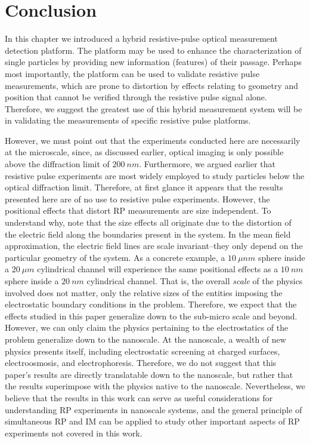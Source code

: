 			
		
	\section{Conclusion}
		In this chapter we introduced a hybrid resistive-pulse optical measurement detection platform. The platform may be used to enhance the characterization of single particles by providing new information (features) of their passage. Perhaps most importantly, the platform can be used to validate resistive pulse measurements, which are prone to distortion by effects relating to geometry and position that cannot be verified through the resistive pulse signal alone. Therefore, we suggest the greatest use of this hybrid measurement system will be in validating the measurements of specific resistive pulse platforms.
		
		However, we must point out that the experiments conducted here are necessarily at the microscale, since, as discussed earlier, optical imaging is only possible above the diffraction limit of $\SI{200}{nm}$. Furthermore, we argued earlier that resistive pulse experiments are most widely employed to study particles below the optical diffraction limit. Therefore, at first glance it appears that the results presented here are of no use to resistive pulse experiments. However, the positional effects that distort RP measurements are size independent. To understand why, note that the size effects all originate due to the distortion of the electric field along the boundaries present in the system. In the mean field approximation, the electric field lines are scale invariant--they only depend on the particular geometry of the system. As a concrete example, a $\SI{10}{\mu nm}$ sphere inside a $\SI{20}{\mu m}$ cylindrical channel will experience the same positional effects as a $\SI{10}{nm}$ sphere inside a $\SI{20}{nm}$ cylindrical channel. That is, the overall \textit{scale} of the physics involved does not matter, only the relative sizes of the entities imposing the electrostatic boundary conditions in the problem. Therefore, we expect that the effects studied in this paper generalize down to the sub-micro scale and beyond. However, we can only claim the physics pertaining to the electrostatics of the problem generalize down to the nanoscale. At the nanoscale, a wealth of new physics presents itself, including electrostatic screening at charged surfaces, electroosmosis, and electrophoresis. Therefore, we do not suggest that this paper's results are directly translatable down to the nanoscale, but rather that the results superimpose with the physics native to the nanoscale. Nevertheless, we believe that the results in this work can serve as useful considerations for understanding RP experiments in nanoscale systems, and the general principle of simultaneous RP and IM can be applied to study other important aspects of RP experiments not covered in this work.
		
		
		



